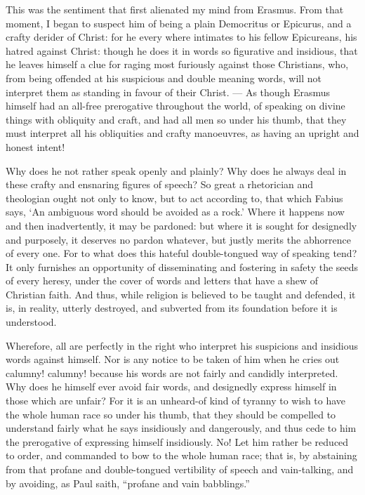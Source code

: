 This was the sentiment that first alienated my mind from Erasmus. From that moment, I began to suspect him of being a plain Democritus or Epicurus, and a crafty derider of Christ: for he every where intimates to his fellow Epicureans, his hatred against Christ: though he does it in words so figurative and insidious, that he leaves himself a clue for raging most furiously against those Christians, who, from being offended at his suspicious and double meaning words, will not interpret them as standing in favour of their Christ. — As though Erasmus himself had an all-free prerogative throughout the world, of speaking on divine things with obliquity and craft, and had all men so under his thumb, that they must interpret all his obliquities and crafty manoeuvres, as having an upright and honest intent!

Why does he not rather speak openly and plainly? Why does he always deal in these crafty and ensnaring figures of speech? So great a rhetorician and theologian ought not only to know, but to act according to, that which Fabius says, ‘An ambiguous word should be avoided as a rock.’ Where it happens now and then inadvertently, it may be pardoned: but where it is sought for designedly and purposely, it deserves no pardon whatever, but justly merits the abhorrence of every one. For to what does this hateful double-tongued way of speaking tend? It only furnishes an opportunity of disseminating and fostering in safety the seeds of every heresy, under the cover of words and letters that have a shew of Christian faith. And thus, while religion is believed to be taught and defended, it is, in reality, utterly destroyed, and subverted from its foundation before it is understood.

Wherefore, all are perfectly in the right who interpret his suspicions and insidious words against himself. Nor is any notice to be taken of him when he cries out calumny! calumny! because his words are not fairly and candidly interpreted. Why does he himself ever avoid fair words, and designedly express himself in those which are unfair? For it is an unheard-of kind of tyranny to wish to have the whole human race so under his thumb, that they should be compelled to understand fairly what he says insidiously and dangerously, and thus cede to him the prerogative of expressing himself insidiously. No! Let him rather be reduced to order, and commanded to bow to the whole human race; that is, by abstaining from that profane and double-tongued vertibility of speech and vain-talking, and by avoiding, as Paul saith, “profane and vain babblings.”

